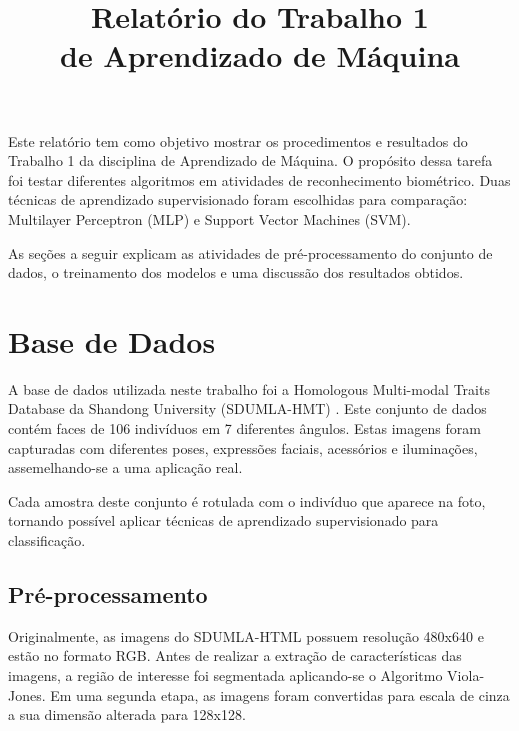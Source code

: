 \documentclass[conference]{IEEEtran}
\begin{document}
\title{Relatório do Trabalho 1\\ de Aprendizado de Máquina}

\author{
}

\maketitle

Este relatório tem como objetivo mostrar os procedimentos e resultados do Trabalho 1 da disciplina de Aprendizado de Máquina. O propósito dessa tarefa foi testar diferentes algoritmos em atividades de reconhecimento biométrico. Duas técnicas de aprendizado supervisionado foram escolhidas para comparação: Multilayer Perceptron (MLP) e Support Vector Machines (SVM).

As seções a seguir explicam as atividades de pré-processamento do conjunto de dados, o treinamento dos modelos e uma discussão dos resultados obtidos.

\section{Base de Dados}
A base de dados utilizada neste trabalho foi a Homologous Multi-modal Traits Database da Shandong University (SDUMLA-HMT) \cite{sdumlahtm}. Este conjunto de dados contém faces de 106 indivíduos em 7 diferentes ângulos. Estas imagens foram capturadas com diferentes poses, expressões faciais, acessórios e iluminações, assemelhando-se a uma aplicação real. 

Cada amostra deste conjunto é rotulada com o indivíduo que aparece na foto, tornando possível aplicar técnicas de aprendizado supervisionado para classificação.

\subsection{Pré-processamento}
Originalmente, as imagens do SDUMLA-HTML possuem resolução 480x640 e estão no formato RGB. Antes de realizar a extração de características das imagens, a região de interesse foi segmentada aplicando-se o Algoritmo Viola-Jones. Em uma segunda etapa, as imagens foram convertidas para escala de cinza a sua dimensão alterada para 128x128.
\end{document}
